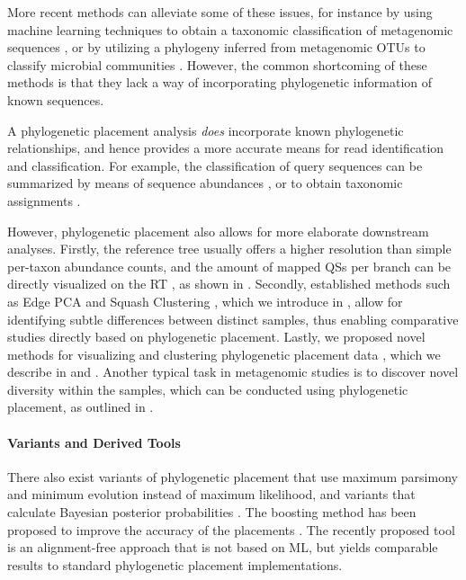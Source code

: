 More recent methods can alleviate some of these issues, for instance by
using machine learning techniques to obtain a taxonomic classification of metagenomic sequences \cite{Vervier2015},
or by utilizing a phylogeny inferred from metagenomic OTUs to classify microbial communities \cite{Tanaseichuk2014}.
However, the common shortcoming of these methods is
that they lack a way of incorporating phylogenetic information of known sequences.

A phylogenetic placement analysis \emph{does} incorporate known phylogenetic relationships,
and hence provides a more accurate means for read identification and classification.
For example, the classification of query sequences
can be summarized by means of sequence abundances \cite{Pace1997,Hugenholtz1998},
or to obtain taxonomic assignments \cite{Kozlov2016}.

However, phylogenetic placement also allows for more elaborate downstream analyses.
Firstly, the reference tree usually offers a higher resolution than simple per-taxon abundance counts,
and the amount of mapped \acp{QS} per branch can be directly visualized on the \ac{RT} \citep{Mahe2017},
as shown in .
Secondly, established methods such as Edge PCA and Squash Clustering \citep{Matsen2011a},
which we introduce in ,
allow for identifying subtle differences between distinct samples,
thus enabling comparative studies directly based on phylogenetic placement.
Lastly, we proposed novel methods for visualizing and clustering phylogenetic placement data \citep{Czech2018a},
which we describe in  and .
Another typical task in metagenomic studies is to discover novel diversity within the samples,
which can be conducted using phylogenetic placement, as outlined in .

\paragraph{Variants and Derived Tools}
\label{ch:Foundations:sec:PhylogeneticPlacement:sub:UseCasesApplications:par:DerivedTools}

There also exist variants of phylogenetic placement that use maximum parsimony \cite{Berger2011}
and minimum evolution \cite{Filipski2015} instead of maximum likelihood,
and variants that calculate Bayesian posterior probabilities \cite{Matsen2010}.
The boosting method  has been proposed to improve the accuracy of the placements \cite{Mirarab2012}.
The recently proposed tool  \cite{Linard2018} is an alignment-free approach
that is not based on ML, but yields comparable results to standard phylogenetic placement implementations.

